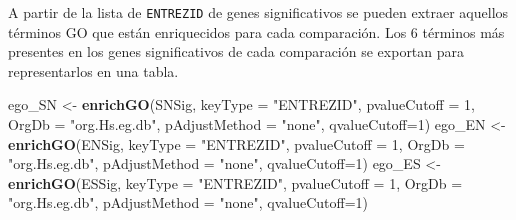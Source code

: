 \documentclass[
]{article}
\newenvironment{Shaded}{\begin{snugshade}}{\end{snugshade}}
\newcommand{\DataTypeTok}[1]{\textcolor[rgb]{0.13,0.29,0.53}{#1}}
\newcommand{\DecValTok}[1]{\textcolor[rgb]{0.00,0.00,0.81}{#1}}
\newcommand{\KeywordTok}[1]{\textcolor[rgb]{0.13,0.29,0.53}{\textbf{#1}}}
\newcommand{\NormalTok}[1]{#1}
\newcommand{\OperatorTok}[1]{\textcolor[rgb]{0.81,0.36,0.00}{\textbf{#1}}}
\newcommand{\StringTok}[1]{\textcolor[rgb]{0.31,0.60,0.02}{#1}}
\begin{document}
\begin{Shaded}
\end{Shaded}

A partir de la lista de \texttt{ENTREZID} de genes significativos se
pueden extraer aquellos términos GO que están enriquecidos para cada
comparación. Los 6 términos más presentes en los genes significativos de
cada comparación se exportan para representarlos en una tabla.

\begin{Shaded}
\begin{Highlighting}[]
\NormalTok{ego_SN <-}\StringTok{ }\KeywordTok{enrichGO}\NormalTok{(SNSig, }\DataTypeTok{keyType =} \StringTok{"ENTREZID"}\NormalTok{, }\DataTypeTok{pvalueCutoff =} \DecValTok{1}\NormalTok{, }
                   \DataTypeTok{OrgDb =} \StringTok{"org.Hs.eg.db"}\NormalTok{, }\DataTypeTok{pAdjustMethod =} \StringTok{"none"}\NormalTok{, }\DataTypeTok{qvalueCutoff=}\DecValTok{1}\NormalTok{)}
\NormalTok{ego_EN <-}\StringTok{ }\KeywordTok{enrichGO}\NormalTok{(ENSig, }\DataTypeTok{keyType =} \StringTok{"ENTREZID"}\NormalTok{, }\DataTypeTok{pvalueCutoff =} \DecValTok{1}\NormalTok{, }
                   \DataTypeTok{OrgDb =} \StringTok{"org.Hs.eg.db"}\NormalTok{, }\DataTypeTok{pAdjustMethod =} \StringTok{"none"}\NormalTok{, }\DataTypeTok{qvalueCutoff=}\DecValTok{1}\NormalTok{)}
\NormalTok{ego_ES <-}\StringTok{ }\KeywordTok{enrichGO}\NormalTok{(ESSig, }\DataTypeTok{keyType =} \StringTok{"ENTREZID"}\NormalTok{, }\DataTypeTok{pvalueCutoff =} \DecValTok{1}\NormalTok{, }
                   \DataTypeTok{OrgDb =} \StringTok{"org.Hs.eg.db"}\NormalTok{, }\DataTypeTok{pAdjustMethod =} \StringTok{"none"}\NormalTok{, }\DataTypeTok{qvalueCutoff=}\DecValTok{1}\NormalTok{)}
\end{Highlighting}
\end{Shaded}
\end{document}
